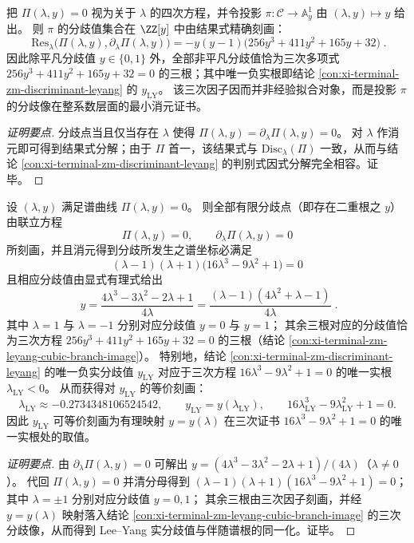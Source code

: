 \begin{conclusion}\label{con:xi-terminal-zm-leyang-cubic-branch-image}
把 \(\Pi(\lambda,y)=0\) 视为关于 \(\lambda\) 的四次方程，并令投影
\(
\pi:\mathcal C\to\mathbb A^1_y
\)
由 \((\lambda,y)\mapsto y\) 给出。
则 \(\pi\) 的分歧值集合在 \(\ZZ[y]\) 中由结果式精确刻画：
\[
\boxed{\;
\mathrm{Res}_{\lambda}\!\bigl(\Pi(\lambda,y),\partial_{\lambda}\Pi(\lambda,y)\bigr)
=-y(y-1)\bigl(256y^3+411y^2+165y+32\bigr)\; }.
\]
因此除平凡分歧值 \(y\in\{0,1\}\) 外，全部非平凡分歧值恰为三次多项式
\(
256y^3+411y^2+165y+32
=0
\)
的三根；其中唯一负实根即结论 \ref{con:xi-terminal-zm-discriminant-leyang} 的 \(y_{\mathrm{LY}}\)。
该三次因子因而并非经验拟合对象，而是投影 \(\pi\) 的分歧像在整系数层面的最小消元证书。
\end{conclusion}
\begin{proof}[证明要点]
分歧点当且仅当存在 \(\lambda\) 使得 \(\Pi(\lambda,y)=\partial_\lambda\Pi(\lambda,y)=0\)。
对 \(\lambda\) 作消元即可得到结果式分解；由于 \(\Pi\) 首一，该结果式与 \(\mathrm{Disc}_{\lambda}(\Pi)\) 一致，从而与结论 \ref{con:xi-terminal-zm-discriminant-leyang} 的判别式因式分解完全相容。证毕。
\end{proof}

\begin{conclusion}\label{con:xi-terminal-zm-leyang-lambda-cubic}
设 \((\lambda,y)\) 满足谱曲线 \(\Pi(\lambda,y)=0\)。
则全部有限分歧点（即存在二重根之 \(y\)）由联立方程
\[
\Pi(\lambda,y)=0,\qquad \partial_{\lambda}\Pi(\lambda,y)=0
\]
所刻画，并且消元得到分歧所发生之谱坐标必满足
\[
\boxed{\;(\lambda-1)(\lambda+1)\bigl(16\lambda^3-9\lambda^2+1\bigr)=0\;}
\]
且相应分歧值由显式有理式给出
\[
\boxed{\;
y=\frac{4\lambda^3-3\lambda^2-2\lambda+1}{4\lambda}
=\frac{(\lambda-1)(4\lambda^2+\lambda-1)}{4\lambda}\; }.
\]
其中 \(\lambda=1\) 与 \(\lambda=-1\) 分别对应分歧值 \(y=0\) 与 \(y=1\)；
其余三根对应的分歧值恰为三次方程 \(256y^3+411y^2+165y+32=0\) 的三根（结论 \ref{con:xi-terminal-zm-leyang-cubic-branch-image}）。
特别地，结论 \ref{con:xi-terminal-zm-discriminant-leyang} 的唯一负实分歧值 \(y_{\mathrm{LY}}\) 对应于三次方程 \(16\lambda^3-9\lambda^2+1=0\) 的唯一实根 \(\lambda_{\mathrm{LY}}<0\)。
从而获得对 \(y_{\mathrm{LY}}\) 的等价刻画：
\[
\lambda_{\mathrm{LY}}\approx -0.2734348106524542,
\qquad y_{\mathrm{LY}}=y(\lambda_{\mathrm{LY}}),
\qquad 16\lambda_{\mathrm{LY}}^3-9\lambda_{\mathrm{LY}}^2+1=0.
\]
因此 \(y_{\mathrm{LY}}\) 可等价刻画为有理映射 \(y=y(\lambda)\) 在三次证书 \(16\lambda^3-9\lambda^2+1=0\) 的唯一实根处的取值。
\end{conclusion}
\begin{proof}[证明要点]
由 \(\partial_{\lambda}\Pi(\lambda,y)=0\) 可解出
\(
y=(4\lambda^3-3\lambda^2-2\lambda+1)/(4\lambda)
\)（\(\lambda\neq 0\)）。
代回 \(\Pi(\lambda,y)=0\) 并清分母得到
\(
(\lambda-1)(\lambda+1)(16\lambda^3-9\lambda^2+1)=0
\)；
其中 \(\lambda=\pm 1\) 分别对应分歧值 \(y=0,1\)；
其余三根由三次因子刻画，并经 \(y=y(\lambda)\) 映射落入结论 \ref{con:xi-terminal-zm-leyang-cubic-branch-image} 的三次分歧像，从而得到 Lee--Yang 实分歧值与伴随谱根的同一化。证毕。
\end{proof}

